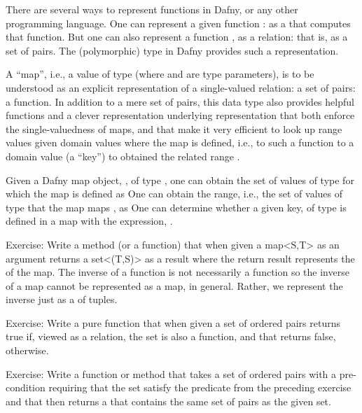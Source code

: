 \documentclass[letterpaper,10pt,english]{sphinxmanual}
\begin{document}
There are several ways to represent functions in Dafny, or any other
programming language. One can represent a given function :
as a  that computes that function. But one can also represent
a function , as a relation: that is, as a set of pairs.
The (polymorphic)  type in Dafny provides such a representation.

A “map”, i.e., a value of type  (where  and  are type
parameters), is to be understood as an explicit representation of a
single-valued relation: a set of pairs: a function. In addition to a
mere set of pairs, this data type also provides helpful functions and
a clever representation underlying representation that both enforce
the single-valuedness of maps, and that make it very efficient to look
up range values given domain values where the map is defined, i.e., to
 such a function to a domain value (a “key”) to obtained the
related range .

Given a Dafny map object, , of type , one can obtain the
set of values of type  for which the map is defined as 
One can obtain the range, i.e., the set of values of type  that the
map maps , as  One can determine whether a given key,
 of type  is defined in a map with the expression, .

Exercise: Write a method (or a function) that when given a map\textless{}S,T\textgreater{} as
an argument returns a set\textless{}(T,S)\textgreater{} as a result where the return result
represents the  of the map. The inverse of a function is not
necessarily a function so the inverse of a map cannot be represented
as a map, in general. Rather, we represent the inverse just as a 
of  tuples.

Exercise: Write a pure function that when given a set of ordered pairs
returns true if, viewed as a relation, the set is also a function, and
that returns false, otherwise.

Exercise: Write a function or method that takes a set of ordered pairs
with a pre-condition requiring that the set satisfy the predicate from
the preceding exercise and that then returns a  that contains the
same set of pairs as the given set.
\end{document}
